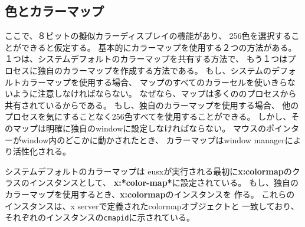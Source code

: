 \begin{refdesc}



\end{refdesc}

\subsection{色とカラーマップ}

\begin{refdesc}
\end{refdesc}

ここで、８ビットの擬似カラーディスプレイの機能があり、
256色を選択することができると仮定する。
基本的にカラーマップを使用する２つの方法がある。
１つは、システムデフォルトのカラーマップを共有する方法で、
もう１つはプロセスに独自のカラーマップを作成する方法である。
もし、システムのデフォルトカラーマップを使用する場合、
マップのすべてのカラーセルを使いきらないように注意しなければならない。
なぜなら、マップは多くののプロセスから共有されているからである。
もし、独自のカラーマップを使用する場合、
他のプロセスを気にすることなく256色すべてを使用することができる。
しかし、そのマップは明確に独自のwindowに設定しなければならない。
マウスのポインターがwindow内のどこかに動かされたとき、
カラーマップはwindow managerにより活性化される。

システムデフォルトのカラーマップは
eusxが実行される最初に{\bf x:colormap}のクラスのインスタンスとして、
{\bf x:*color-map*}に設定されている。
もし、独自のカラーマップを使用するとき、{\bf x:colormap}のインスタンスを
作る。
これらのインスタンスは、x serverで定義されたcolormapオブジェクトと
一致しており、それぞれのインスタンスの{\tt cmapid}に示されている。

